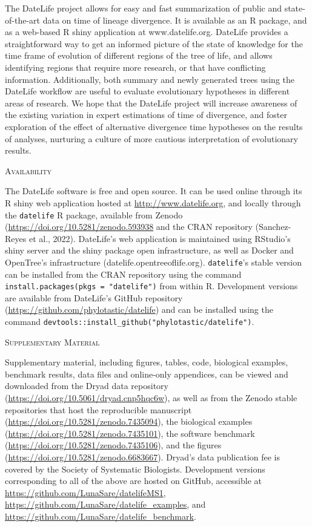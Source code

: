\documentclass[english,man]{apa6}
\begin{document}
The DateLife project allows for easy and fast summarization of public and state-of-the-art data on time of lineage divergence.
It is available as an R package, and as a web-based R shiny application at www.datelife.org.
DateLife provides a straightforward way to get an informed picture of the state of knowledge for the time frame of evolution of different regions of the tree of life, and allows identifying regions that require more research, or that have conflicting information.
Additionally, both summary and newly generated trees using the DateLife workflow are useful to evaluate evolutionary hypotheses in different areas of research. We hope that the DateLife project will increase awareness of the existing variation in expert estimations of time of divergence, and foster exploration of the effect of alternative divergence time hypotheses on the results of analyses, nurturing a culture of more cautious interpretation of evolutionary results.

\begin{center}
\textsc{Availability}
\end{center}

The DateLife software is free and open source. It can be used online through its R shiny web application hosted at \url{http://www.datelife.org}, and locally through the \texttt{datelife} R package, available from Zenodo (\url{https://doi.org/10.5281/zenodo.593938} and the CRAN repository (Sanchez-Reyes et al., 2022).
DateLife's web application is maintained using RStudio's shiny server and the shiny package open infrastructure, as well as Docker and OpenTree's infrastructure (datelife.opentreeoflife.org).
\texttt{datelife}'s stable version can be installed from the CRAN repository using the command \texttt{install.packages(pkgs\ =\ "datelife")} from within R.
Development versions are available from DateLife's GitHub repository (\url{https://github.com/phylotastic/datelife}) and can be installed using the command \texttt{devtools::install\_github("phylotastic/datelife")}.

\begin{center}
\textsc{Supplementary Material}
\end{center}

Supplementary material, including figures, tables, code, biological examples, benchmark results, data files and online-only appendices, can be viewed and downloaded from the Dryad data repository (\url{https://doi.org/10.5061/dryad.cnp5hqc6w}), as well as from the Zenodo stable repositories that host the reproducible manuscript (\url{https://doi.org/10.5281/zenodo.7435094}), the biological examples (\url{https://doi.org/10.5281/zenodo.7435101}), the software benchmark (\url{https://doi.org/10.5281/zenodo.7435106}), and the figures (\url{https://doi.org/10.5281/zenodo.6683667}).
Dryad's data publication fee is covered by the Society of Systematic Biologists.
Development versions corresponding to all of the above are hosted on GitHub, accessible at \url{https://github.com/LunaSare/datelifeMS1}, \url{https://github.com/LunaSare/datelife_examples}, and \url{https://github.com/LunaSare/datelife_benchmark}.
\end{document}
